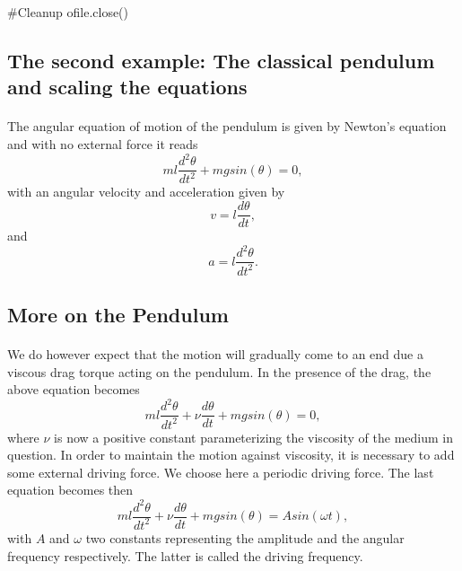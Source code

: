 \documentclass[%
oneside,                 %
final,                   %
10pt]{article}
\begin{document}
#Cleanup
ofile.close() 

\epypro





\subsection{The second example: The classical pendulum and scaling the equations}

\paragraph{}
The angular equation of motion of the pendulum is given by
Newton's equation and with no external force it reads 
\begin{equation}
  ml\frac{d^2\theta}{dt^2}+mgsin(\theta)=0,
\end{equation}
with an angular velocity and acceleration given by
\begin{equation}
     v=l\frac{d\theta}{dt},
\end{equation}
and 
\begin{equation}
     a=l\frac{d^2\theta}{dt^2}.
\end{equation}



\subsection{More on the Pendulum}

\paragraph{}
We do however expect that the motion will gradually come to an end due a viscous drag torque acting on the pendulum. 
In the presence of the drag, the above equation becomes
\begin{equation}
   ml\frac{d^2\theta}{dt^2}+\nu\frac{d\theta}{dt}  +mgsin(\theta)=0, \label{eq:pend1}
\end{equation}
where $\nu$ is now a positive constant parameterizing the viscosity
of the medium in question. In order to maintain the motion against
viscosity, it is necessary to add some external driving force. 
We choose here a periodic driving force. The last equation becomes then
\begin{equation}
   ml\frac{d^2\theta}{dt^2}+\nu\frac{d\theta}{dt}  +mgsin(\theta)=Asin(\omega t), \label{eq:pend2}
\end{equation}
with $A$ and $\omega$ two constants representing the amplitude and 
the angular frequency respectively. The latter is called the driving frequency.
\end{document}
